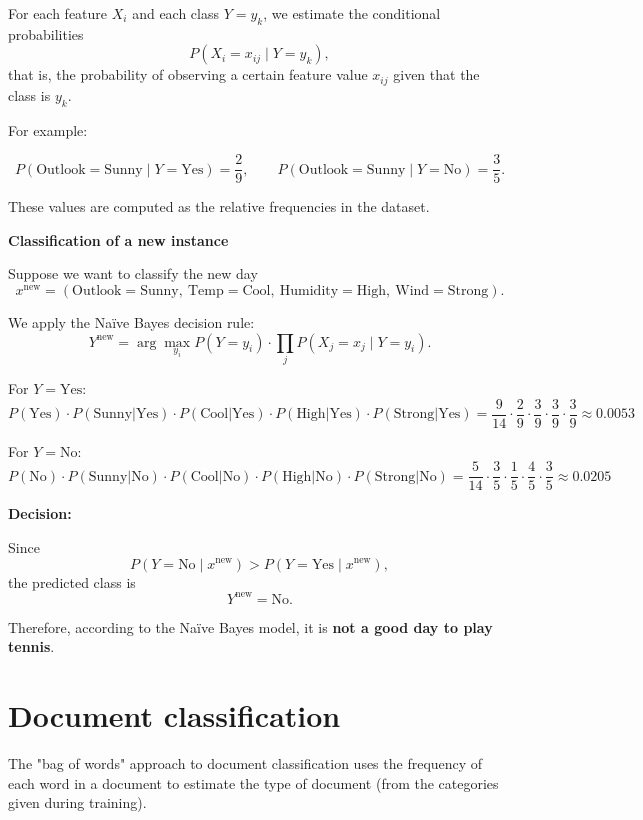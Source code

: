 {    For each feature $X_i$ and each class $Y = y_k$, we estimate the conditional probabilities
    \[
    P(X_i = x_{ij} \mid Y = y_k),
    \]
    that is, the probability of observing a certain feature value $x_{ij}$ given that the class is $y_k$.

    For example:

    \[
    P(\text{Outlook} = \text{Sunny} \mid Y = \text{Yes}) = \frac{2}{9}, \qquad
    P(\text{Outlook} = \text{Sunny} \mid Y = \text{No}) = \frac{3}{5}.
    \]

    These values are computed as the relative frequencies in the dataset.

    \medskip
    \textbf{Classification of a new instance}

    Suppose we want to classify the new day
    \[
    x^{\text{new}} = (\text{Outlook} = \text{Sunny},\ 
    \text{Temp} = \text{Cool},\ 
    \text{Humidity} = \text{High},\ 
    \text{Wind} = \text{Strong}).
    \]

    We apply the Naïve Bayes decision rule:
    \[
    Y^{\text{new}} = 
    \arg\max_{y_i} P(Y = y_i) 
    \cdot 
    \prod_j P(X_j = x_j \mid Y = y_i).
    \]

    \medskip
    For $Y = \text{Yes}$:
    \[
    P(\text{Yes}) \cdot P(\text{Sunny}|\text{Yes}) \cdot P(\text{Cool}|\text{Yes}) 
    \cdot P(\text{High}|\text{Yes}) \cdot P(\text{Strong}|\text{Yes})
    = \frac{9}{14} \cdot \frac{2}{9} \cdot \frac{3}{9} \cdot \frac{3}{9} \cdot \frac{3}{9} 
    \approx 0.0053
    \]

    For $Y = \text{No}$:
    \[
    P(\text{No}) \cdot P(\text{Sunny}|\text{No}) \cdot P(\text{Cool}|\text{No}) 
    \cdot P(\text{High}|\text{No}) \cdot P(\text{Strong}|\text{No})
    = \frac{5}{14} \cdot \frac{3}{5} \cdot \frac{1}{5} \cdot \frac{4}{5} \cdot \frac{3}{5} 
    \approx 0.0205
    \]

    \medskip
    \textbf{Decision:}

    Since
    \[
    P(Y = \text{No} \mid x^{\text{new}}) > P(Y = \text{Yes} \mid x^{\text{new}}),
    \]
    the predicted class is
    \[
    Y^{\text{new}} = \text{No}.
    \]

    \medskip
    Therefore, according to the Naïve Bayes model, it is \textbf{not a good day to play tennis}.


}

\section{Document classification}
The "bag of words" approach to document classification uses the frequency of each word in a document to estimate the type of document (from the categories given during training).

